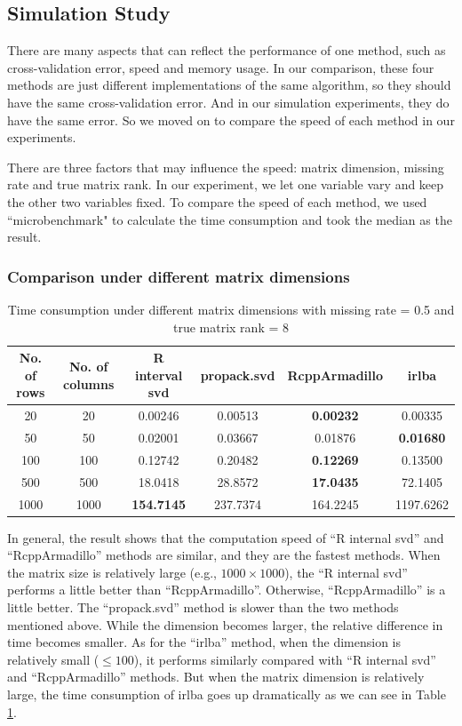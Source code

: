 \documentclass[12pt]{article}
\begin{document}
	\subsection{Simulation Study}
	
	There are many aspects that can reflect the performance of one method, such as cross-validation error, speed and memory usage. In our comparison, these four methods are just different implementations of the same algorithm, so they should have the same cross-validation error. And in our simulation experiments, they do have the same error.  So we moved on to compare the speed of each method in our experiments.
	
	There are three factors that may influence the speed: matrix dimension, missing rate and true matrix rank. In our experiment, we let one variable vary and keep the other two variables fixed. To compare the speed of each method, we used ``microbenchmark" to calculate the time consumption and took the median as the result.
	
	\subsubsection{Comparison under different matrix dimensions}
	
\begin{table}[ht]
	\centering
	\caption{Time consumption under different matrix dimensions with missing rate = 0.5 and true matrix rank = 8 }\label{dimension}
	\begin{tabular}{cccccc}
		\hline\hline
	No. of rows & No. of columns & R interval svd & propack.svd & RcppArmadillo & irlba\\
	\hline
	20&20&0.00246&0.00513&\textbf{0.00232}&0.00335\\
	50&50&0.02001&0.03667&0.01876&\textbf{0.01680}\\
	100&100&0.12742&0.20482&\textbf{0.12269}&0.13500\\
	500&500&18.0418&28.8572&\textbf{17.0435}&72.1405\\
	1000&1000&\textbf{154.7145}&237.7374&164.2245&1197.6262\\
		\hline\hline
	\end{tabular}
\end{table}

In general, the result shows that the computation speed of “R internal svd” and “RcppArmadillo” methods are similar, and they are the fastest methods. When the matrix size is relatively large (e.g., $1000\times1000$), the “R internal svd” performs a little better than “RcppArmadillo”. Otherwise, “RcppArmadillo” is a little better. The “propack.svd” method is slower than the two methods mentioned above.  While the dimension becomes larger, the relative difference in time becomes smaller. As for the “irlba” method, when the dimension is relatively small ($\leq 100$), it performs similarly compared with “R internal svd” and “RcppArmadillo” methods. But when the matrix dimension is relatively large, the time consumption of irlba goes up dramatically as we can see in Table \ref{dimension}.
\end{document}
